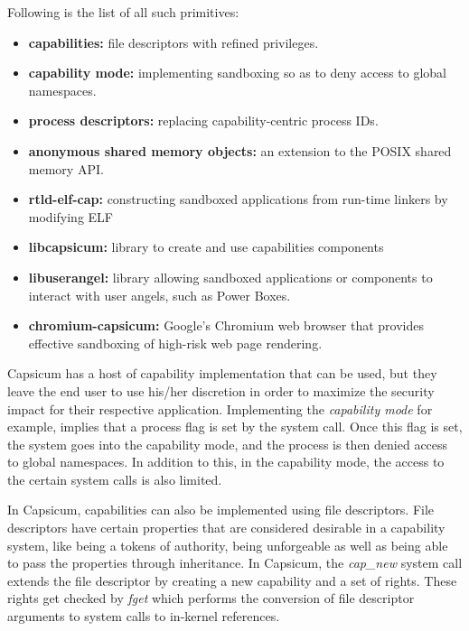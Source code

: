Following is the list of all such primitives:

		\begin{itemize}
		    \item \textbf{capabilities:} file descriptors with refined privileges.
   		    \item \textbf{capability mode:} implementing sandboxing so as to deny access to global namespaces.
    		    \item \textbf{process descriptors:} replacing capability-centric process IDs. 
    		    \item \textbf{anonymous shared memory objects:} an extension to the POSIX shared memory API.
    		    \item \textbf{rtld-elf-cap:} constructing sandboxed applications from run-time linkers by modifying ELF 
    		    \item \textbf{libcapsicum:} library to create and use capabilities components
    		    \item \textbf{libuserangel:} library allowing sandboxed applications or components to interact with user angels, such as Power Boxes.
    		    \item \textbf{chromium-capsicum:} Google's Chromium web browser that provides effective sandboxing of high-risk web page rendering.

		\end{itemize}
		
Capsicum has a host of capability implementation that can be used, but they leave the end user to use his/her discretion in order to maximize the security impact for their respective application. Implementing the \textit{capability mode} for example, implies that a process flag is set by the system call. Once this flag is set, the system goes into the capability mode, and the process is then denied access to global namespaces. In addition to this, in the capability mode, the access to the certain system calls is also limited.

In Capsicum, capabilities can also be implemented using file descriptors. File descriptors have certain properties that are considered desirable in a capability system, like being a tokens of authority, being unforgeable as well as being able to pass the properties through inheritance. In Capsicum, the \textit{cap\_new} system call extends the file descriptor by creating a new capability and a set of rights. These rights get checked by \textit{fget} which performs the conversion of file descriptor  arguments to system calls to in-kernel references.